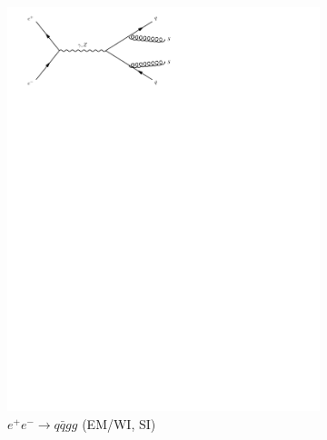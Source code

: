 \begin{figure}[h]
  \centering
  \begin{subfigure}[b]{0.3\textwidth}
    \includegraphics[trim={0.5cm 22cm 10cm 0cm},width=\textwidth]{../Diagrams/D1.pdf}
    \caption{$e^+e^- \rightarrow q\bar{q}gg$ (EM/WI, SI)}
    \label{fey:1}
  \end{subfigure}%
  ~
  \begin{subfigure}[b]{0.3\textwidth}

\end{subfigure}
\end{figure}
